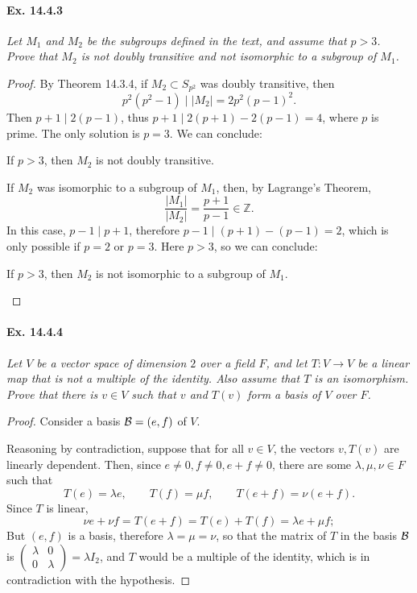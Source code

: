 \documentclass[11pt,a4paper]{article}
\newcommand{\Z}{\mathbb{Z}}
\begin{document}
{\paragraph{Ex. 14.4.3}{\it Let $M_1$ and $M_2$ be the subgroups defined in the text, and assume that $p>3$. Prove that $M_2$ is not doubly transitive and not isomorphic to a subgroup of $M_1$.
}
\begin{proof} By Theorem 14.3.4, if $M_2 \subset S_{p^2}$ was doubly transitive, then $$p^2(p^2-1) \mid |M_2| = 2p^2(p-1)^2.$$
Then $p+1 \mid 2(p-1)$, thus $p+1 \mid  2(p+1) - 2(p-1) = 4$, where $p$ is prime. The only solution is $p=3$. We can conclude:
\begin{center}
If $p>3$, then $M_2$ is not doubly transitive.
\end{center}
If $M_2$ was isomorphic to a subgroup of $M_1$, then, by Lagrange's Theorem,
$$
\frac{|M_1|}{|M_2|} = \frac{p+1}{p-1} \in \Z.
$$
In this case, $p-1 \mid p+1$, therefore $p-1 \mid (p+1)- (p-1) = 2$, which is only possible if $p = 2$ or $p=3$. Here $p>3$, so we can conclude:
\begin{center}
If $p>3$, then $M_2$ is not isomorphic to a subgroup of $M_1$.
\end{center}
\end{proof}

\paragraph{Ex. 14.4.4}{\it Let $V$ be a vector space of dimension $2$ over a field $F$, and let $T : V \to V$ be a linear map that is not a multiple of the identity. Also assume that $T$ is an isomorphism. Prove that there is $v \in V$ such that $v$ and $T(v)$ form a basis of $V$ over $F$.
}

\begin{proof} Consider a basis ${\cal B} = (e,f)$ of $V$.

Reasoning by contradiction, suppose that for all $v \in V$, the vectors $v,T(v)$ are linearly dependent. Then, since $e\ne 0,f \ne 0, e+f \ne 0$, there are some $\lambda, \mu,\nu \in F$ such that
$$T(e) = \lambda e,\qquad T(f) = \mu f, \qquad T(e+f) = \nu (e+f).$$
Since $T$ is linear,
$$\nu e + \nu f = T(e+f) = T(e) + T(f) = \lambda e + \mu f;$$
But $(e,f)$ is a basis, therefore $\lambda = \mu = \nu$, so that the matrix of $T$ in the basis $\cal B$ is
$
\begin{pmatrix}
\lambda & 0 \\
0 &\lambda
\end{pmatrix}
= \lambda I_2
$, and $T$ would be a multiple of the identity, which is in contradiction with the hypothesis.


\end{proof}}
\end{document}
